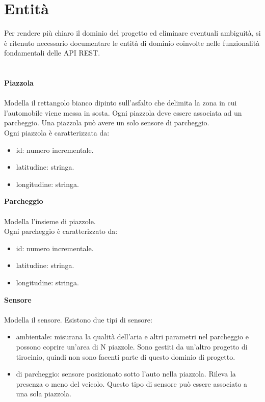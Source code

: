 \section{Entità}
Per rendere più chiaro il dominio del progetto ed eliminare eventuali ambiguità, si è ritenuto necessario
documentare le entità di dominio coinvolte nelle funzionalità fondamentali delle \gls{API} \gls{REST}.
\\\\\\
\textbf{Piazzola}
\\\\
Modella il rettangolo bianco dipinto sull'asfalto che delimita la zona in cui l'automobile viene messa
in sosta. Ogni piazzola deve essere associata ad un parcheggio. Una piazzola può avere un solo sensore
di parcheggio.
\\
Ogni piazzola è caratterizzata da:
\begin{itemize}
    \item id: numero incrementale.
    \item latitudine: stringa.
    \item longitudine: stringa.
\end{itemize}
\leavevmode\newline
\textbf{Parcheggio}
\\\\
Modella l'insieme di piazzole.
\\
Ogni parcheggio è caratterizzato da:
\begin{itemize}
    \item id: numero incrementale.
    \item latitudine: stringa.
    \item longitudine: stringa.
\end{itemize}
\leavevmode\newline
\textbf{Sensore}
\\\\
Modella il sensore. Esistono due tipi di sensore:
\begin{itemize}
    \item ambientale: misurana la qualità dell'aria e altri parametri nel parcheggio e possono 
        coprire un'area di N piazzole.
        Sono gestiti da un'altro progetto di tirocinio, quindi non sono facenti parte di questo dominio di progetto.
    \item di parcheggio: sensore posizionato sotto l'auto nella piazzola. Rileva la presenza o meno
        del veicolo. Questo tipo di sensore può essere associato a una sola piazzola.
\end{itemize}
